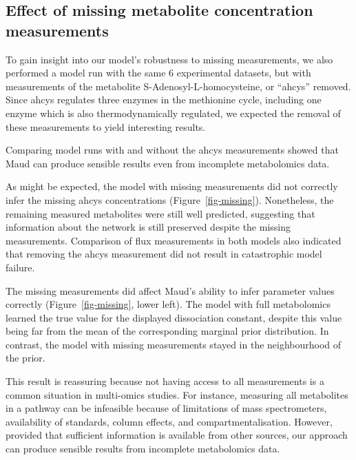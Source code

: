 \documentclass[journal=asbcd6,manuscript=article,layout=traditional]{achemso}
\begin{document}
\hypertarget{effect-of-missing-metabolite-concentration-measurements}{%
\subsection{Effect of missing metabolite concentration
measurements}\label{effect-of-missing-metabolite-concentration-measurements}}

To gain insight into our model's robustness to missing measurements, we
also performed a model run with the same 6 experimental datasets, but
with measurements of the metabolite S-Adenosyl-L-homocysteine, or
``ahcys'' removed. Since ahcys regulates three enzymes in the methionine
cycle, including one enzyme which is also thermodynamically regulated,
we expected the removal of these measurements to yield interesting
results.

Comparing model runs with and without the ahcys measurements showed that
Maud can produce sensible results even from incomplete metabolomics
data.

As might be expected, the model with missing measurements did not
correctly infer the missing ahcys concentrations
(Figure~\ref{fig-missing}). Nonetheless, the remaining measured
metabolites were still well predicted, suggesting that information about
the network is still preserved despite the missing measurements.
Comparison of flux measurements in both models also indicated that
removing the ahcys measurement did not result in catastrophic model
failure.

The missing measurements did affect Maud's ability to infer parameter
values correctly (Figure~\ref{fig-missing}, lower left). The model with
full metabolomics learned the true value for the displayed dissociation
constant, despite this value being far from the mean of the
corresponding marginal prior distribution. In contrast, the model with
missing measurements stayed in the neighbourhood of the prior.

This result is reassuring because not having access to all measurements
is a common situation in multi-omics studies. For instance, measuring
all metabolites in a pathway can be infeasible because of limitations of
mass spectrometers, availability of standards, column effects, and
compartmentalisation. However, provided that sufficient information is
available from other sources, our approach can produce sensible results
from incomplete metabolomics data.
\end{document}
